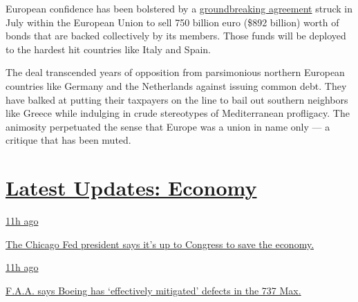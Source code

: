 European confidence has been bolstered by a
\href{https://www.nytimes3xbfgragh.onion/2020/07/20/world/europe/eu-stimulus-coronavirus.html}{groundbreaking
agreement} struck in July within the European Union to sell 750 billion
euro (\$892 billion) worth of bonds that are backed collectively by its
members. Those funds will be deployed to the hardest hit countries like
Italy and Spain.

The deal transcended years of opposition from parsimonious northern
European countries like Germany and the Netherlands against issuing
common debt. They have balked at putting their taxpayers on the line to
bail out southern neighbors like Greece while indulging in crude
stereotypes of Mediterranean profligacy. The animosity perpetuated the
sense that Europe was a union in name only --- a critique that has been
muted.

\hypertarget{latest-updates-economy}{%
\section{\texorpdfstring{\href{https://www.nytimes3xbfgragh.onion/live/2020/08/03/business/stock-market-today-coronavirus?action=click\&pgtype=Article\&state=default\&region=MAIN_CONTENT_1\&context=storylines_live_updates}{Latest
Updates:
Economy}}{Latest Updates: Economy}}\label{latest-updates-economy}}

\href{https://www.nytimes3xbfgragh.onion/live/2020/08/03/business/stock-market-today-coronavirus?action=click\&pgtype=Article\&state=default\&region=MAIN_CONTENT_1\&context=storylines_live_updates\#the-chicago-fed-president-says-its-up-to-congress-to-save-the-economy}{11h
ago}

\href{https://www.nytimes3xbfgragh.onion/live/2020/08/03/business/stock-market-today-coronavirus?action=click\&pgtype=Article\&state=default\&region=MAIN_CONTENT_1\&context=storylines_live_updates\#the-chicago-fed-president-says-its-up-to-congress-to-save-the-economy}{The
Chicago Fed president says it's up to Congress to save the economy.}

\href{https://www.nytimes3xbfgragh.onion/live/2020/08/03/business/stock-market-today-coronavirus?action=click\&pgtype=Article\&state=default\&region=MAIN_CONTENT_1\&context=storylines_live_updates\#faa-says-boeing-has-effectively-mitigated-defects-in-the-737-max}{11h
ago}

\href{https://www.nytimes3xbfgragh.onion/live/2020/08/03/business/stock-market-today-coronavirus?action=click\&pgtype=Article\&state=default\&region=MAIN_CONTENT_1\&context=storylines_live_updates\#faa-says-boeing-has-effectively-mitigated-defects-in-the-737-max}{F.A.A.
says Boeing has `effectively mitigated' defects in the 737 Max.}

